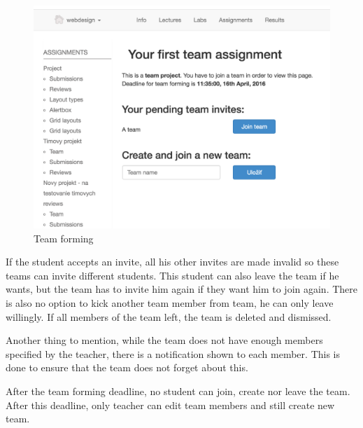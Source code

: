 \begin{figure}[h]
    \centering
    \includegraphics[width=\textwidth]{images/teamforming.png}
    \caption{Team forming}
    \label{team_forming}
\end{figure}

If the student accepts an invite, all his other invites are made invalid so these teams can invite different students. This student can also leave the team if he wants, but the team has to invite him again if they want him to join again. There is also no option to kick another team member from team, he can only leave willingly. If all members of the team left, the team is deleted and dismissed.

Another thing to mention, while the team does not have enough members specified by the teacher, there is a notification shown to each member. This is done to ensure that the team does not forget about this.

After the team forming deadline, no student can join, create nor leave the team. After this deadline, only teacher can edit team members and still create new team. 

